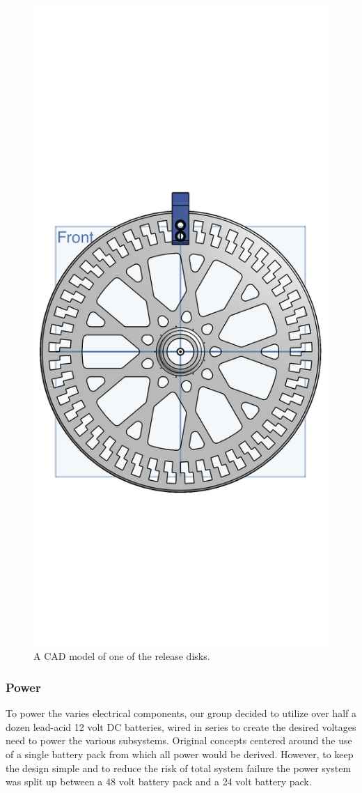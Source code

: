 \begin{figure}[H]
  \centering
  \includegraphics[width=.7\textwidth]{Figures/ReleaseDisk1.png}
  \caption{\label{fig:ReleaseDisk1}A CAD model of one of the release disks.}
\end{figure}

\subsubsection{Power}

\indent\indent To power the varies electrical components, our group decided to utilize over half a dozen lead-acid 12 volt DC batteries, wired in series to create the desired voltages need to power the various subsystems. Original concepts centered around the use of a single battery pack from which all power would be derived. However, to keep the design simple and to reduce the risk of total system failure the power system was split up between a 48 volt battery pack and a 24 volt battery pack. 

